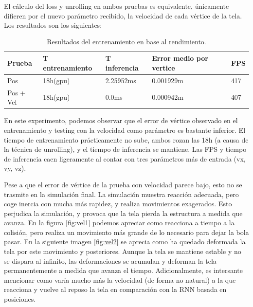 El cálculo del loss y unrolling en ambos pruebas es equivalente, únicamente difieren por el nuevo parámetro recibido, la velocidad de cada vértice de la tela. 
Los resultados son los siguientes:
\begin{table}[H]
    \begin{center}
        \begin{tabular}{ | m{2.2cm} |  m{2.8cm} | m{2.8cm} | m{2.6cm} | m{1.2cm} |}
        \hline \textbf{Prueba} & \textbf{T entrenamiento} & \textbf{T inferencia} & \textbf{Error medio por vertice} & \textbf{FPS} \\ \hline
            Pos & 18h(gpu) & 2.25952ms & 0.001929m & 417 \\ \hline
            Pos + Vel & 18h(gpu) & 0.0ms & 0.000942m & 407 \\ \hline
        \end{tabular}
    \end{center}
    \caption{Resultados del entrenamiento en base al rendimiento.}
    \label{tab:rendResults}
\end{table}

En este experimento, podemos observar que el error de vértice observado en el entrenamiento y testing con la velocidad como parámetro es bastante inferior. El tiempo de entrenamiento prácticamente no sube, ambos rozan las 18h (a causa de la técnica de unrolling), y el tiempo de inferencia se mantiene. Las FPS y tiempo de inferencia caen ligeramente al contar con tres parámetros más de entrada (vx, vy, vz).

Pese a que el error de vértice de la prueba con velocidad parece bajo, esto no se trasmite en la simulación final. La simulación muestra reacción adecuada, pero coge inercia con mucha más rapidez, y realiza movimientos exagerados. Esto perjudica la simulación, y provoca que la tela pierda la estructura a medida que avanza. En la figura \ref{fig:vel1} podemos apreciar como reacciona a tiempo a la colisión, pero realiza un movimiento más grande de lo necesario para dejar la bola pasar. En la siguiente imagen \ref{fig:vel2} se aprecia como ha quedado deformada la tela por este movimiento y posteriores. Aunque la tela se mantiene estable y no se dispara al infinito, las deformaciones se acumulan y deforman la tela permanentemente a medida que avanza el tiempo. Adicionalmente, es intersante mencionar como varía mucho más la velocidad (de forma no natural) a la que reacciona y vuelve al reposo la tela en comparación con la RNN basada en posiciones.

